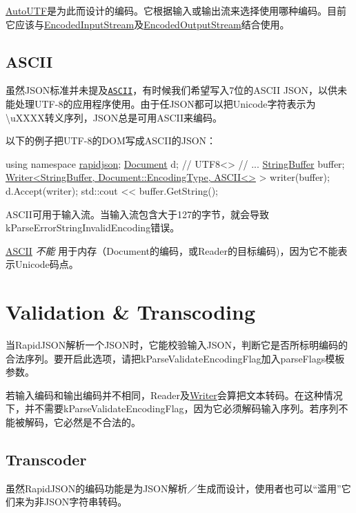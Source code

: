 {\ttfamily \hyperlink{struct_auto_u_t_f}{Auto\+U\+TF}}是为此而设计的编码。它根据输入或输出流来选择使用哪种编码。目前它应该与{\ttfamily \hyperlink{class_encoded_input_stream}{Encoded\+Input\+Stream}}及{\ttfamily \hyperlink{class_encoded_output_stream}{Encoded\+Output\+Stream}}结合使用。\hypertarget{md_Commun_Externe_RapidJSON_doc_encoding.zh-cn_ASCII}{}\subsection{A\+S\+C\+II}\label{md_Commun_Externe_RapidJSON_doc_encoding.zh-cn_ASCII}
虽然\+J\+S\+O\+N标准并未提及\href{http://en.wikipedia.org/wiki/ASCII}{\tt A\+S\+C\+II}，有时候我们希望写入7位的\+A\+S\+C\+II J\+S\+O\+N，以供未能处理\+U\+T\+F-\/8的应用程序使用。由于任\+J\+S\+O\+N都可以把\+Unicode字符表示为{\ttfamily \textbackslash{}u\+X\+X\+XX}转义序列，\+J\+S\+O\+N总是可用\+A\+S\+C\+I\+I来编码。

以下的例子把\+U\+T\+F-\/8的\+D\+O\+M写成\+A\+S\+C\+I\+I的\+J\+S\+O\+N：


\begin{DoxyCode}
\textcolor{keyword}{using namespace }\hyperlink{namespacerapidjson}{rapidjson};
\hyperlink{class_generic_document}{Document} d; \textcolor{comment}{// UTF8<>}
\textcolor{comment}{// ...}
\hyperlink{class_generic_string_buffer}{StringBuffer} buffer;
\hyperlink{class_writer}{Writer<StringBuffer, Document::EncodingType, ASCII<>} > 
      writer(buffer);
d.Accept(writer);
std::cout << buffer.GetString();
\end{DoxyCode}


A\+S\+C\+I\+I可用于输入流。当输入流包含大于127的字节，就会导致{\ttfamily k\+Parse\+Error\+String\+Invalid\+Encoding}错误。

\hyperlink{struct_a_s_c_i_i}{A\+S\+C\+II} {\itshape 不能} 用于内存（{\ttfamily Document}的编码，或{\ttfamily Reader}的目标编码)，因为它不能表示\+Unicode码点。\hypertarget{md_Commun_Externe_RapidJSON_doc_encoding.zh-cn_ValidationTranscoding}{}\section{Validation \& Transcoding}\label{md_Commun_Externe_RapidJSON_doc_encoding.zh-cn_ValidationTranscoding}
当\+Rapid\+J\+S\+O\+N解析一个\+J\+S\+O\+N时，它能校验输入\+J\+S\+O\+N，判断它是否所标明编码的合法序列。要开启此选项，请把{\ttfamily k\+Parse\+Validate\+Encoding\+Flag}加入{\ttfamily parse\+Flags}模板参数。

若输入编码和输出编码并不相同，{\ttfamily Reader}及{\ttfamily \hyperlink{class_writer}{Writer}}会算把文本转码。在这种情况下，并不需要{\ttfamily k\+Parse\+Validate\+Encoding\+Flag}，因为它必须解码输入序列。若序列不能被解码，它必然是不合法的。\hypertarget{md_Commun_Externe_RapidJSON_doc_encoding.zh-cn_Transcoder}{}\subsection{Transcoder}\label{md_Commun_Externe_RapidJSON_doc_encoding.zh-cn_Transcoder}
虽然\+Rapid\+J\+S\+O\+N的编码功能是为\+J\+S\+O\+N解析／生成而设计，使用者也可以“滥用”它们来为非\+J\+S\+O\+N字符串转码。

